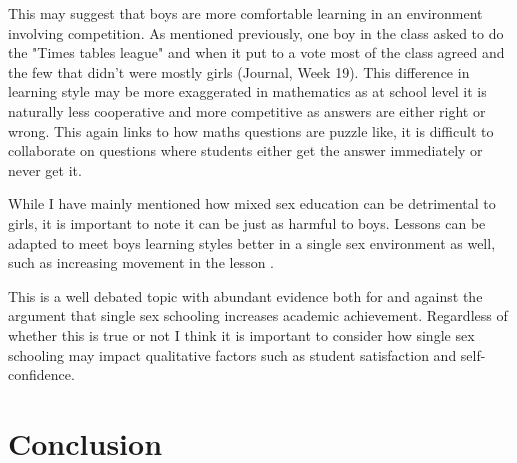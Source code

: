 \documentclass[11pt, a4paper, notitlepage]{article}
\begin{document}
This may suggest that boys are more comfortable learning in an environment involving competition. As mentioned previously, one boy in the class asked to do the "Times tables league" and when it put to a vote most of the class agreed and the few that didn't were mostly girls (Journal, Week 19). This difference in learning style may be more exaggerated in mathematics as at school level it is naturally less cooperative and more competitive as answers are either right or wrong. This again links to how maths questions are puzzle like, it is difficult to collaborate on questions where students either get the answer immediately or never get it.
\par
While I have mainly mentioned how mixed sex education can be detrimental to girls, it is important to note it can be just as harmful to boys. Lessons can be adapted to meet boys learning styles better in a single sex environment as well, such as increasing movement in the lesson \cite{Hughes:2006}.
\par
This is a well debated topic with abundant evidence both for and against the argument that single sex schooling increases academic achievement. Regardless of whether this is true or not I think it is important to consider how single sex schooling may impact qualitative factors such as student satisfaction and self-confidence.


\section*{Conclusion}




\end{document}
